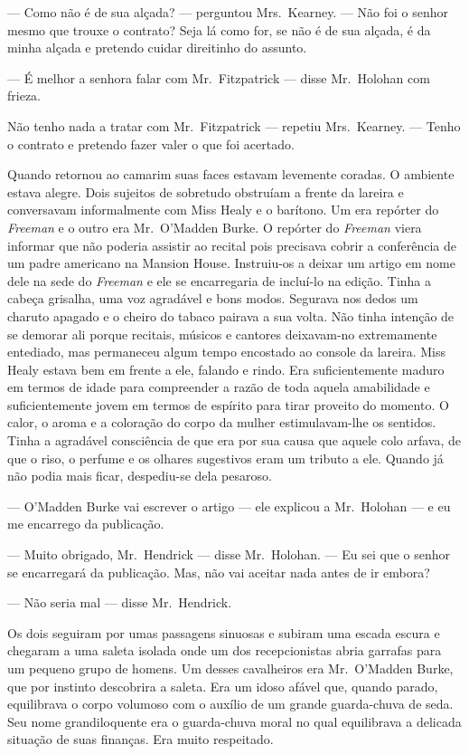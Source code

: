 --- Como não é de sua alçada? --- perguntou Mrs.~Kearney.  --- Não foi o senhor
mesmo que trouxe o contrato?  Seja lá como for, se não é de sua alçada, é da
minha alçada e pretendo cuidar direitinho do assunto.

--- É melhor a senhora falar com Mr.~Fitzpatrick --- disse Mr.~Holohan com
frieza.

Não tenho nada a tratar com Mr.~Fitzpatrick --- repetiu Mrs.~Kearney.  ---
Tenho o contrato e pretendo fazer valer o que foi acertado.

Quando retornou ao camarim suas faces estavam levemente coradas.  O ambiente
estava alegre.  Dois sujeitos de sobretudo obstruíam a frente da lareira e
conversavam informalmente com Miss Healy e o barítono.  Um era repórter do
\textit{Freeman} e o outro era Mr.~O’Madden Burke.  O repórter do
\textit{Freeman} viera informar que não poderia assistir ao recital pois
precisava cobrir a conferência de um padre americano na Mansion House.
Instruiu-os a deixar um artigo em nome dele na sede do \textit{Freeman} e ele
se encarregaria de incluí-lo na edição.  Tinha a cabeça grisalha, uma voz
agradável e bons modos.  Segurava nos dedos um charuto apagado e o cheiro do
tabaco pairava a sua volta.  Não tinha intenção de se demorar ali porque
recitais, músicos e cantores deixavam-no extremamente entediado, mas permaneceu
algum tempo encostado ao console da lareira.  Miss Healy estava bem em frente a
ele, falando e rindo.  Era suficientemente maduro em termos de idade para
compreender a razão de toda aquela amabilidade e suficientemente jovem em
termos de espírito para tirar proveito do momento.  O calor, o aroma e a
coloração do corpo da mulher estimulavam-lhe os sentidos.  Tinha a agradável
consciência de que era por sua causa que aquele colo arfava, de que o riso, o
perfume e os olhares sugestivos eram um tributo a ele.  Quando já não podia
mais ficar, despediu-se dela pesaroso.

--- O’Madden Burke vai escrever o artigo --- ele explicou a Mr.~Holohan --- e
eu me encarrego da publicação.

--- Muito obrigado, Mr.~Hendrick --- disse Mr.~Holohan.  --- Eu sei que o
senhor se encarregará da publicação.  Mas, não vai aceitar nada antes de ir
embora?

--- Não seria mal --- disse Mr.~Hendrick.

Os dois seguiram por umas passagens sinuosas e subiram uma escada escura e
chegaram a uma saleta isolada onde um dos recepcionistas abria garrafas para um
pequeno grupo de homens.  Um desses cavalheiros era Mr.~O’Madden Burke, que por
instinto descobrira a saleta.  Era um idoso afável que, quando parado,
equilibrava o corpo volumoso com o auxílio de um grande guarda-chuva de seda.
Seu nome grandiloquente era o guarda-chuva moral no qual equilibrava a delicada
situação de suas finanças.  Era muito respeitado.

